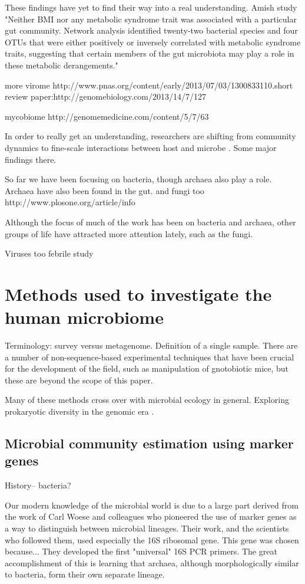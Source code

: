 \documentclass{amsart}
\begin{document}
These findings have yet to find their way into a real understanding.
Amish study \cite{zupancic2012analysis}
"Neither BMI nor any metabolic syndrome trait was associated with a particular gut community. Network analysis identified twenty-two bacterial species and four OTUs that were either positively or inversely correlated with metabolic syndrome traits, suggesting that certain members of the gut microbiota may play a role in these metabolic derangements."

more virome
http://www.pnas.org/content/early/2013/07/03/1300833110.short
review paper:http://genomebiology.com/2013/14/7/127

mycobiome
http://genomemedicine.com/content/5/7/63


In order to really get an understanding, researchers are shifting from community dynamics to fine-scale interactions between host and microbe \cite{hooper2012interactions}.
Some major findings there.

So far we have been focusing on bacteria, though archaea also play a role.
Archaea have also been found in the gut.
and fungi too
http://www.plosone.org/article/info%

Although the focus of much of the work has been on bacteria and archaea, other groups of life have attracted more attention lately, such as the fungi.

Viruses too
febrile study \cite{wylie2012sequence}


\section{Methods used to investigate the human microbiome}

Terminology: survey versus metagenome.
Definition of a single sample.
There are a number of non-sequence-based experimental techniques that have been crucial for the development of the field, such as manipulation of gnotobiotic mice, but these are beyond the scope of this paper.

Many of these methods cross over with microbial ecology in general.
Exploring prokaryotic diversity in the genomic era \cite{hugenholtz2002review}.


\subsection{Microbial community estimation using marker genes}
History-- bacteria?

Our modern knowledge of the microbial world is due to a large part derived from the work of Carl Woese and colleagues who pioneered the use of marker genes as a way to distinguish between microbial lineages.
Their work, and the scientists who followed them, used especially the 16S ribosomal gene.
This gene was chosen because...
They developed the first "universal" 16S PCR primers.
The great accomplishment of this is learning that archaea, although morphologically similar to bacteria, form their own separate lineage.
\end{document}
